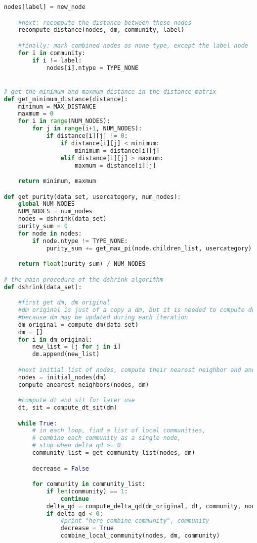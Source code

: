 \begin{lstlisting}[language={python}, caption={DSHRINK算法}, label=code:dshrink]
    nodes[label] = new_node

    #next: recompute the distance between these nodes
    recompute_distance(nodes, dm, community, label)

    #finally: mark combined nodes as none type, except the label node
    for i in community:
        if i != label:
            nodes[i].ntype = TYPE_NONE


# get the minimum and maxmum distance in the distance matrix
def get_minimum_distance(distance):
    minimum = MAX_DISTANCE
    maxmum = 0
    for i in range(NUM_NODES):
        for j in range(i+1, NUM_NODES):
            if distance[i][j] != 0:
                if distance[i][j] < minimum:
                    minimum = distance[i][j]
                elif distance[i][j] > maxmum:
                    maxmum = distance[i][j]

    return minimum, maxmum

def get_purity(data_set, usercategory, num_nodes):
    global NUM_NODES
    NUM_NODES = num_nodes
    nodes = dshrink(data_set)
    purity_sum = 0
    for node in nodes:
        if node.ntype != TYPE_NONE:
            purity_sum += get_max_pi(node.children_list, usercategory)

    return float(purity_sum) / NUM_NODES

# the main procedure of the dshrink algorithm
def dshrink(data_set):

    #first get dm, dm original
    #dm original is just of a copy a dm, but it is needed to compute delta qd
    #because dm may be updated during each iteration
    dm_original = compute_dm(data_set)
    dm = []
    for i in dm_original:
        new_list = [j for j in i]
        dm.append(new_list)

    #next initial list of nodes, compute their nearest neighbor and anearest neighbors
    nodes = initial_nodes(dm)
    compute_anearest_neighbors(nodes, dm)

    #compute dt and sit for later use
    dt, sit = compute_dt_sit(dm)

    while True:
        # in each loop, find a list of local communities,
        # combine each community as a single node,
        # stop when delta qd >= 0
        community_list = get_community_list(nodes, dm)

        decrease = False

        for community in community_list:
            if len(community) == 1:
                continue
            delta_qd = compute_delta_qd(dm_original, dt, community, nodes, sit)
            if delta_qd < 0:
                #print "here combine community", community
                decrease = True
                combine_local_community(nodes, dm, community)


\end{lstlisting}
